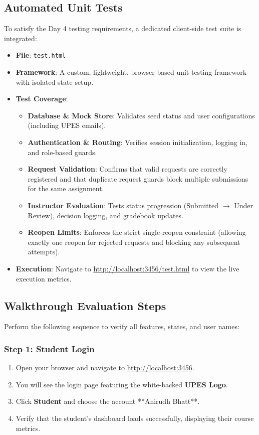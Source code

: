 \documentclass{article}
\begin{document}
\subsection{Automated Unit Tests}
To satisfy the Day 4 testing requirements, a dedicated client-side test suite is integrated:
\begin{itemize}
    \item \textbf{File}: \texttt{test.html}
    \item \textbf{Framework}: A custom, lightweight, browser-based unit testing framework with isolated state setup.
    \item \textbf{Test Coverage}:
    \begin{itemize}
        \item \textbf{Database \& Mock Store}: Validates seed status and user configurations (including UPES emails).
        \item \textbf{Authentication \& Routing}: Verifies session initialization, logging in, and role-based guards.
        \item \textbf{Request Validation}: Confirms that valid requests are correctly registered and that duplicate request guards block multiple submissions for the same assignment.
        \item \textbf{Instructor Evaluation}: Tests status progression (Submitted $\to$ Under Review), decision logging, and gradebook updates.
        \item \textbf{Reopen Limits}: Enforces the strict single-reopen constraint (allowing exactly one reopen for rejected requests and blocking any subsequent attempts).
    \end{itemize}
    \item \textbf{Execution}: Navigate to \url{http://localhost:3456/test.html} to view the live execution metrics.
\end{itemize}

\subsection{Walkthrough Evaluation Steps}
Perform the following sequence to verify all features, states, and user names:

\subsubsection{Step 1: Student Login}
\begin{enumerate}
    \item Open your browser and navigate to \url{http://localhost:3456}.
    \item You will see the login page featuring the white-backed \textbf{UPES Logo}.
    \item Click \textbf{Student} and choose the account **Anirudh Bhatt**.
    \item Verify that the student's dashboard loads successfully, displaying their course metrics.
\end{enumerate}
\end{document}
